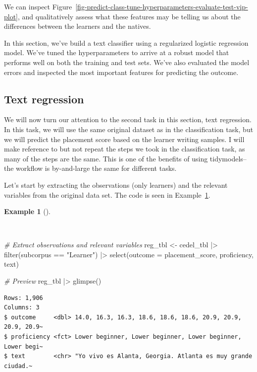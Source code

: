 \documentclass[
  letterpaper,
]{latex/krantz}
\newenvironment{Shaded}{\begin{snugshade}}{\end{snugshade}}
\newcommand{\AttributeTok}[1]{\textcolor[rgb]{0.00,0.00,0.00}{#1}}
\newcommand{\CommentTok}[1]{\textcolor[rgb]{0.00,0.00,0.00}{\textit{#1}}}
\newcommand{\FunctionTok}[1]{\textcolor[rgb]{0.00,0.00,0.00}{#1}}
\newcommand{\NormalTok}[1]{\textcolor[rgb]{0.00,0.00,0.00}{#1}}
\newcommand{\OtherTok}[1]{\textcolor[rgb]{0.00,0.00,0.00}{#1}}
\newcommand{\SpecialCharTok}[1]{\textcolor[rgb]{0.00,0.00,0.00}{#1}}
\newcommand{\StringTok}[1]{\textcolor[rgb]{0.00,0.00,0.00}{#1}}
\theoremstyle{definition}
\newtheorem{example}{Example}[chapter]
\theoremstyle{remark}
\begin{document}
We can inspect
Figure~\ref{fig-predict-class-tune-hyperparameters-evaluate-test-vip-plot},
and qualitatively assess what these features may be telling us about the
differences between the learners and the natives.

In this section, we've build a text classifier using a regularized
logistic regression model. We've tuned the hyperparameters to arrive at
a robust model that performs well on both the training and test sets.
We've also evaluated the model errors and inspected the most important
features for predicting the outcome.

\subsection{Text regression}\label{sec-predict-text-regression}

We will now turn our attention to the second task in this section, text
regression. In this task, we will use the same original dataset as in
the classification task, but we will predict the placement score based
on the learner writing samples. I will make reference to but not repeat
the steps we took in the classification task, as many of the steps are
the same. This is one of the benefits of using tidymodels--the workflow
is by-and-large the same for different tasks.

Let's start by extracting the observations (only learners) and the
relevant variables from the original data set. The code is seen in
Example~\ref{exm-predict-reg-data}.

\begin{example}[]\protect\hypertarget{exm-predict-reg-data}{}\label{exm-predict-reg-data}

~

\begin{Shaded}
\begin{Highlighting}[]
\CommentTok{\# Extract observations and relevant variables}
\NormalTok{reg\_tbl }\OtherTok{\textless{}{-}}
\NormalTok{  cedel\_tbl }\SpecialCharTok{|\textgreater{}}
  \FunctionTok{filter}\NormalTok{(subcorpus }\SpecialCharTok{==} \StringTok{"Learner"}\NormalTok{) }\SpecialCharTok{|\textgreater{}}
  \FunctionTok{select}\NormalTok{(}\AttributeTok{outcome =}\NormalTok{ placement\_score, proficiency, text)}

\CommentTok{\# Preview}
\NormalTok{reg\_tbl }\SpecialCharTok{|\textgreater{}} \FunctionTok{glimpse}\NormalTok{()}
\end{Highlighting}
\end{Shaded}

\begin{verbatim}
Rows: 1,906
Columns: 3
$ outcome     <dbl> 14.0, 16.3, 16.3, 18.6, 18.6, 18.6, 20.9, 20.9, 20.9, 20.9~
$ proficiency <fct> Lower beginner, Lower beginner, Lower beginner, Lower begi~
$ text        <chr> "Yo vivo es Alanta, Georgia. Atlanta es muy grande ciudad.~
\end{verbatim}

\end{example}
\end{document}
